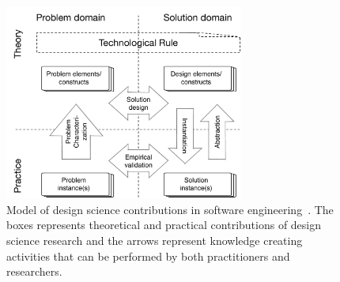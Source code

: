 \documentclass[graybox]{svmult}
\begin{document}
\begin{figure}
  \includegraphics[width=0.7\textwidth]{Figures/DS_model.pdf}
\caption{Model of design science contributions in software engineering~\cite{Engstrom19arxiv}. The boxes represents theoretical and practical contributions of design science research and the arrows represent knowledge creating activities that can be performed by both practitioners and researchers.}
\label{fig:DS_model}       %
\end{figure}

\end{document}
